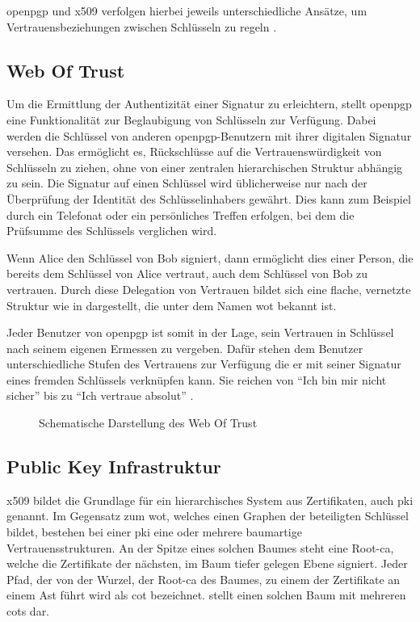 \gls{openpgp} und \gls{x509} verfolgen hierbei jeweils unterschiedliche Ansätze, um Vertrauensbeziehungen zwischen Schlüsseln zu regeln
\cite{krypto-pki-internet}.

\subsection{Web Of Trust}
\label{sec:GrundlagenDefinitionen:Vertrauen:WOT}
Um die Ermittlung der Authentizität einer Signatur zu erleichtern, stellt \gls{openpgp} eine Funktionalität zur Beglaubigung von Schlüsseln zur Verfügung. Dabei
werden die Schlüssel von anderen \gls{openpgp}-Benutzern mit ihrer digitalen Signatur versehen. Das ermöglicht es, Rückschlüsse auf die Vertrauenswürdigkeit
von Schlüsseln zu ziehen, ohne von einer zentralen hierarchischen Struktur abhängig zu sein. Die Signatur auf einen Schlüssel wird üblicherweise nur nach der
Überprüfung der Identität des Schlüsselinhabers gewährt. Dies kann zum Beispiel durch ein Telefonat oder ein persönliches Treffen erfolgen, bei dem die
Prüfsumme des Schlüssels verglichen wird.  

Wenn Alice den Schlüssel von Bob signiert, dann ermöglicht dies einer Person, die bereits dem Schlüssel von Alice vertraut, auch dem Schlüssel von Bob zu
vertrauen. Durch diese Delegation von Vertrauen bildet sich eine flache, vernetzte Struktur wie in  dargestellt, die unter dem Namen \gls{wot}
bekannt ist. 

Jeder Benutzer von \gls{openpgp} ist somit in der Lage, sein Vertrauen in Schlüssel nach seinem eigenen Ermessen zu vergeben. Dafür stehen dem
Benutzer unterschiedliche Stufen des Vertrauens zur Verfügung die er mit seiner Signatur eines fremden Schlüssels verknüpfen kann. Sie reichen von "`Ich bin mir
nicht sicher"' bis zu "`Ich vertraue absolut"' \cite{pgp}.

\begin{figure}
\centering

\caption{Schematische Darstellung des Web Of Trust}
\label{fig:wot}
\end{figure}

\subsection{Public Key Infrastruktur}
\label{sec:GrundlagenDefinitionen:Vertrauen:PKI}
\gls{x509} bildet die Grundlage für ein hierarchisches System aus Zertifikaten, auch \gls{pki} genannt. Im Gegensatz zum \gls{wot}, welches einen Graphen der
beteiligten Schlüssel bildet, bestehen bei einer \gls{pki} eine oder mehrere baumartige Vertrauensstrukturen.
An der Spitze eines solchen Baumes steht eine Root-\gls{ca}, welche die Zertifikate der nächsten, im Baum tiefer gelegen Ebene signiert. Jeder Pfad, der von der
Wurzel, der Root-\gls{ca} des Baumes, zu einem der Zertifikate an einem Ast führt wird als \gls{cot} bezeichnet.  stellt einen solchen Baum mit
mehreren \glspl{cot} dar.

